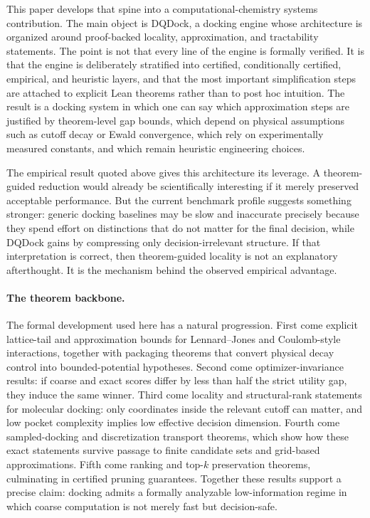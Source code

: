 This paper develops that spine into a computational-chemistry systems contribution. The main object is DQDock, a docking engine whose architecture is organized around proof-backed locality, approximation, and tractability statements. The point is not that every line of the engine is formally verified. It is that the engine is deliberately stratified into certified, conditionally certified, empirical, and heuristic layers, and that the most important simplification steps are attached to explicit Lean theorems rather than to post hoc intuition. The result is a docking system in which one can say which approximation steps are justified by theorem-level gap bounds, which depend on physical assumptions such as cutoff decay or Ewald convergence, which rely on experimentally measured constants, and which remain heuristic engineering choices.

The empirical result quoted above gives this architecture its leverage. A theorem-guided reduction would already be scientifically interesting if it merely preserved acceptable performance. But the current benchmark profile suggests something stronger: generic docking baselines may be slow and inaccurate precisely because they spend effort on distinctions that do not matter for the final decision, while DQDock gains by compressing only decision-irrelevant structure. If that interpretation is correct, then theorem-guided locality is not an explanatory afterthought. It is the mechanism behind the observed empirical advantage.

\paragraph{The theorem backbone.}
The formal development used here has a natural progression. First come explicit lattice-tail and approximation bounds for Lennard--Jones and Coulomb-style interactions, together with packaging theorems that convert physical decay control into bounded-potential hypotheses. Second come optimizer-invariance results: if coarse and exact scores differ by less than half the strict utility gap, they induce the same winner. Third come locality and structural-rank statements for molecular docking: only coordinates inside the relevant cutoff can matter, and low pocket complexity implies low effective decision dimension. Fourth come sampled-docking and discretization transport theorems, which show how these exact statements survive passage to finite candidate sets and grid-based approximations. Fifth come ranking and top-$k$ preservation theorems, culminating in certified pruning guarantees. Together these results support a precise claim: docking admits a formally analyzable low-information regime in which coarse computation is not merely fast but decision-safe.

